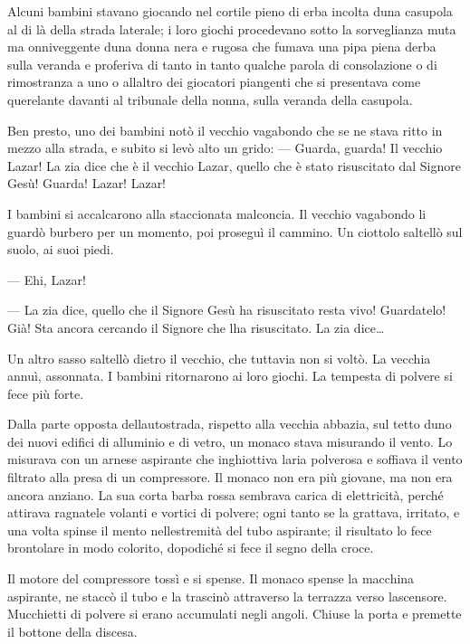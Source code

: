 	Alcuni bambini stavano giocando nel cortile pieno di erba incolta
	d\textquotesingle una casupola al di là della strada laterale; i loro
	giochi procedevano sotto la sorveglianza muta ma onniveggente
	d\textquotesingle una donna nera e rugosa che fumava una pipa piena
	d\textquotesingle erba sulla veranda e proferiva di tanto in tanto
	qualche parola di consolazione o di rimostranza a uno o
	all\textquotesingle altro dei giocatori piangenti che si presentava come
	querelante davanti al tribunale della nonna, sulla veranda della
	casupola.
	
	Ben presto, uno dei bambini notò il vecchio vagabondo che se ne stava
	ritto in mezzo alla strada, e subito si levò alto un grido: --- Guarda,
	guarda! Il vecchio Lazar! La zia dice che è il vecchio Lazar, quello che
	è stato risuscitato dal Signore Gesù! Guarda! Lazar! Lazar!
	
	I bambini si accalcarono alla staccionata malconcia. Il vecchio
	vagabondo li guardò burbero per un momento, poi proseguì il cammino. Un
	ciottolo saltellò sul suolo, ai suoi piedi.
	
	--- Ehi, Lazar!
	
	--- La zia dice, quello che il Signore Gesù ha risuscitato resta vivo!
	Guardatelo! Già! Sta ancora cercando il Signore che l\textquotesingle ha
	risuscitato. La zia dice\ldots{}
	
	Un altro sasso saltellò dietro il vecchio, che tuttavia non si voltò. La
	vecchia annuì, assonnata. I bambini ritornarono ai loro giochi. La
	tempesta di polvere si fece più forte.
	
	Dalla parte opposta dell\textquotesingle autostrada, rispetto alla
	vecchia abbazia, sul tetto d\textquotesingle uno dei nuovi edifici di
	alluminio e di vetro, un monaco stava misurando il vento. Lo misurava
	con un arnese aspirante che inghiottiva l\textquotesingle aria polverosa
	e soffiava il vento filtrato alla presa di un compressore. Il monaco non
	era più giovane, ma non era ancora anziano. La sua corta barba rossa
	sembrava carica di elettricità, perché attirava ragnatele volanti e
	vortici di polvere; ogni tanto se la grattava, irritato, e una volta
	spinse il mento nell\textquotesingle estremità del tubo aspirante; il
	risultato lo fece brontolare in modo colorito, dopodiché si fece il
	segno della croce.
	
	Il motore del compressore tossì e si spense. Il monaco spense la
	macchina aspirante, ne staccò il tubo e la trascinò attraverso la
	terrazza verso l\textquotesingle ascensore. Mucchietti di polvere si
	erano accumulati negli angoli. Chiuse la porta e premette il bottone
	della discesa.
	
